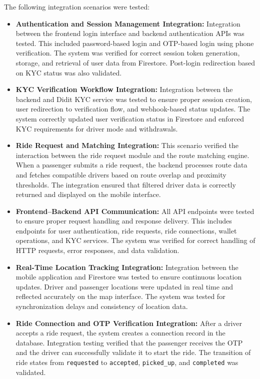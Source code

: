 \documentclass[10pt,a4paper]{report}
\begin{document}
\justify\large The following integration scenarios were tested:

\begin{itemize}

\item \textbf{Authentication and Session Management Integration:}
Integration between the frontend login interface and backend authentication APIs was tested. This included password-based login and OTP-based login using phone verification. The system was verified for correct session token generation, storage, and retrieval of user data from Firestore. Post-login redirection based on KYC status was also validated.

\item \textbf{KYC Verification Workflow Integration:}
Integration between the backend and Didit KYC service was tested to ensure proper session creation, user redirection to verification flow, and webhook-based status updates. The system correctly updated user verification status in Firestore and enforced KYC requirements for driver mode and withdrawals.

\item \textbf{Ride Request and Matching Integration:}
This scenario verified the interaction between the ride request module and the route matching engine. When a passenger submits a ride request, the backend processes route data and fetches compatible drivers based on route overlap and proximity thresholds. The integration ensured that filtered driver data is correctly returned and displayed on the mobile interface.

\item \textbf{Frontend–Backend API Communication:}
All API endpoints were tested to ensure proper request handling and response delivery. This includes endpoints for user authentication, ride requests, ride connections, wallet operations, and KYC services. The system was verified for correct handling of HTTP requests, error responses, and data validation.

\item \textbf{Real-Time Location Tracking Integration:}
Integration between the mobile application and Firestore was tested to ensure continuous location updates. Driver and passenger locations were updated in real time and reflected accurately on the map interface. The system was tested for synchronization delays and consistency of location data.

\item \textbf{Ride Connection and OTP Verification Integration:}
After a driver accepts a ride request, the system creates a connection record in the database. Integration testing verified that the passenger receives the OTP and the driver can successfully validate it to start the ride. The transition of ride states from \texttt{requested} to \texttt{accepted}, \texttt{picked\_up}, and \texttt{completed} was validated.


\end{itemize}
\end{document}
